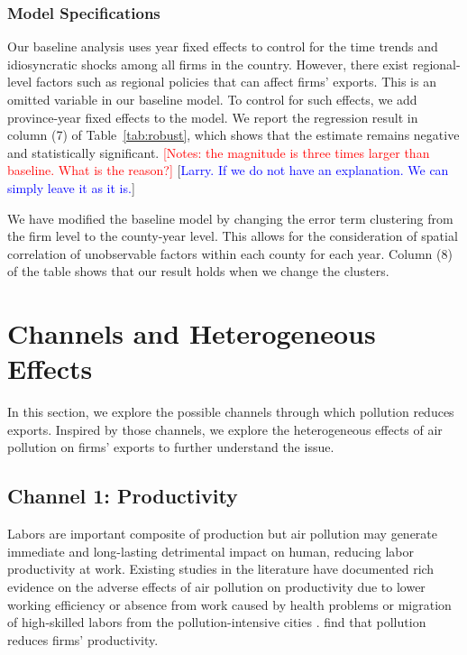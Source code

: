 \documentclass[12pt]{article}
\begin{document}
\subsubsection{Model Specifications}
Our baseline analysis uses year fixed effects to control for the time trends
and idiosyncratic shocks among all firms in the country. However, there
exist regional-level factors such as regional policies that can affect
firms' exports. This is an omitted variable in our baseline model. To
control for such effects, we add province-year fixed effects to the model.
We report the regression result in column (7) of Table~\ref{tab:robust},
which shows that the estimate remains negative and statistically
significant. 
\textcolor{red}{[Notes: the magnitude
is three times larger than baseline. What is the reason?]} [\textcolor{blue}{Larry. If we do not have an explanation. We can simply leave it as it is.}] 

We have modified the baseline model by changing the error term clustering from the firm level to the county-year level. This allows for the consideration of spatial correlation of unobservable factors within each county for each year. Column (8) of the table shows that our result holds when we change the clusters.

\section{Channels and Heterogeneous Effects}
\label{sec:5} %

In this section, we explore the possible channels through which pollution
reduces exports. Inspired by those channels, we explore the heterogeneous
effects of air pollution on firms' exports to further understand the issue. 

\subsection{Channel 1: Productivity}
\label{sec:5.1} 
Labors are important composite of production but air
pollution may generate immediate and long-lasting detrimental impact on
human, reducing labor productivity at work. Existing studies in the
literature have documented rich evidence on the adverse effects of air
pollution on productivity due to lower working efficiency or absence from
work caused by health problems %
\citep{chang2016particulate,fu2021air,somanathan2021impact} or migration of
high-skilled labors from the pollution-intensive cities %
\citep{chen2022effect,NBERw28401}. %
\citep{fu2021air,somanathan2021impact,chang2016particulate,adhvaryu2022management}
find that pollution reduces firms' productivity.
\end{document}
